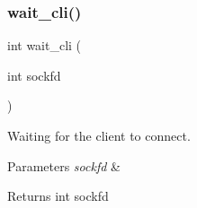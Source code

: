 \subsubsection{wait\+\_\+cli()}
{\footnotesize\ttfamily int wait\+\_\+cli (\begin{DoxyParamCaption}\item[{int}]{sockfd }\end{DoxyParamCaption})}



Waiting for the client to connect. 


\begin{DoxyParams}{Parameters}
{\em sockfd} & \\
\hline
\end{DoxyParams}
\begin{DoxyReturn}{Returns}
int sockfd 
\end{DoxyReturn}
